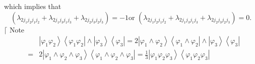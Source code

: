 \documentclass[12pt]{article}
\begin{document}
which implies that%
\begin{equation*}
\left( \lambda _{2j_{1}j_{2}j_{1}j_{2}}+\lambda
_{2j_{1}j_{3}j_{1}j_{3}}+\lambda _{2j_{2}j_{3}j_{2}j_{3}}\right) =-1\text{
or }\left( \lambda _{2j_{1}j_{2}j_{1}j_{2}}+\lambda
_{2j_{1}j_{3}j_{1}j_{3}}+\lambda _{2j_{2}j_{3}j_{2}j_{3}}\right) =0.
\end{equation*}%
$\lceil $ Note 
\begin{eqnarray*}
&&\left\vert \varphi _{1}\varphi _{2}\right\rangle \left\langle \varphi
_{1}\varphi _{2}\right\vert \wedge \left\vert \varphi _{3}\right\rangle
\left\langle \varphi _{3}\right\vert =2\left\vert \varphi _{1}\wedge \varphi
_{2}\right\rangle \left\langle \varphi _{1}\wedge \varphi _{2}\right\vert
\wedge \left\vert \varphi _{3}\right\rangle \left\langle \varphi
_{3}\right\vert \\
&=&2\left\vert \varphi _{1}\wedge \varphi _{2}\wedge \varphi
_{3}\right\rangle \left\langle \varphi _{1}\wedge \varphi _{2}\wedge \varphi
_{3}\right\vert =\frac{1}{3}\left\vert \varphi _{1}\varphi _{2}\varphi
_{3}\right\rangle \left\langle \varphi _{1}\varphi _{2}\varphi
_{3}\right\vert
\end{eqnarray*}%
\end{document}
